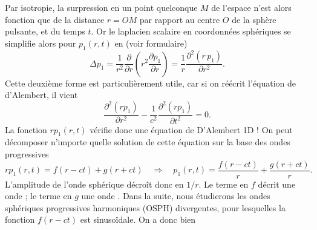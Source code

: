 \documentclass[12pt,fancy]{cours}
\begin{document}
\begin{demo}
Par isotropie, la surpression en un point quelconque $M$ de l'espace n'est alors fonction que de la distance $r=OM$ par rapport au centre $O$ de la sphère pulsante, et du temps $t$.
Or le laplacien scalaire en coordonnées sphériques se simplifie alors pour $p_1(r,t)$ en (voir formulaire)
\begin{equation}
\Delta p_1=\frac{1}{r^2}\frac{\partial }{\partial r}\left(r^2\frac{\partial p_1}{\partial r}\right)=\frac{1}{r}\frac{\partial^2 (r\,p_1)}{\partial r^2}.
\end{equation}
Cette deuxième forme est particulièrement utile, car si on réécrit l'équation de d'Alembert, il vient
\begin{equation}
\frac{\partial^2(rp_1)}{\partial r^2}-\frac{1}{c^2}\frac{\partial^2(rp_1)}{\partial t^2}=0.
\end{equation}
La fonction $rp_1(r,t)$ vérifie donc une équation de D'Alembert 1D
 !  On peut décomposer n’importe quelle solution de cette équation sur la base des ondes progressives
\begin{equation}
rp_1(r,t)=f(r-ct)+g(r+ct)\quad\Rightarrow\quad p_1(r,t)=\frac{f(r-ct)}{r}+\frac{g(r+ct)}{r}.
\end{equation}
L'amplitude de l'onde sphérique décroît donc en $1/r$. Le terme en $f$ décrit une onde  ; le terme en $g$ une onde . Dans la suite, nous étudierons les ondes sphériques progressives harmoniques (OSPH) divergentes, pour lesquelles la fonction $f(r-ct)$ est sinusoïdale. On a donc bien 
\end{demo}
\end{document}
